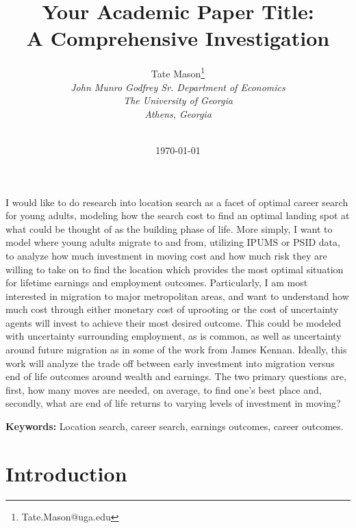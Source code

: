 \documentclass[11pt,a4paper]{article}
\title{Your Academic Paper Title: \\
A Comprehensive Investigation}
\author{
    Tate Mason\thanks{Tate.Mason@uga.edu} \\
    \textit{John Munro Godfrey Sr. Department of Economics} \\
    \textit{The University of Georgia} \\
    \textit{Athens, Georgia} \\
    \\
}
\date{\today}
\newenvironment{abstract}%
{\cleardoublepage\null \vfill\begin{center}%
\bfseries \abstractname \end{center}}%
{\vfill\null}
\begin{document}
\maketitle
\thispagestyle{empty}

\begin{abstract}
\noindent %

I would like to do research into location search as a facet of optimal career search for young adults, modeling how the search cost to find an optimal landing spot at 
what could be thought of as the building phase of life. More simply, I want to model where young adults migrate to and from, utilizing IPUMS or PSID data, to analyze how
much investment in moving cost and how much risk they are willing to take on to find the location which provides the most optimal situation for lifetime earnings and employment
outcomes. Particularly, I am most interested in migration to major metropolitan areas, and want to understand how much cost through either monetary cost of uprooting or the cost
of uncertainty agents will invest to achieve their most desired outcome. This could be modeled with uncertainty surrounding employment, as is common, as well as uncertainty around
future migration as in some of the work from James Kennan. Ideally, this work will analyze the trade off between early investment into migration versus end of life outcomes around
wealth and earnings. The two primary questions are, first, how many moves are needed, on average, to find one's best place and, secondly, what are end of life returns to varying levels 
of investment in moving?

\vspace{0.3cm}
\noindent \textbf{Keywords:} %
Location search, career search, earnings outcomes, career outcomes.
\end{abstract}

\newpage
\setcounter{page}{1}

\section{Introduction}
\label{sec:introduction}

\end{document}
